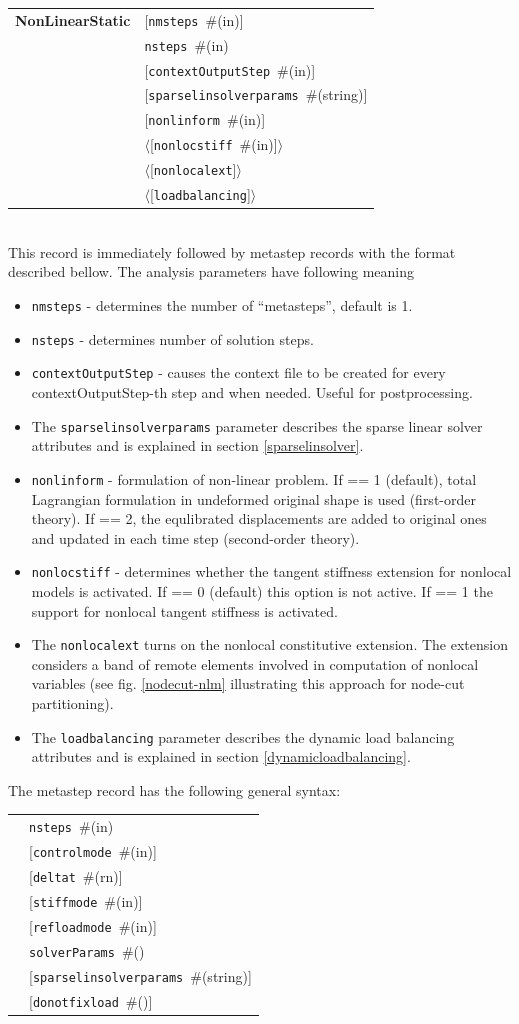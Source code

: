 \documentclass[a4paper]{article}
\makeatletter
\newcommand{\param}[1]{\texttt{#1}} %
\newcommand{\optional}[1]{[#1]} %
\newcommand{\field}[2]{\param{#1}~\#{\tiny(#2)}} %
\newcommand{\optField}[2]{\optional{\field{#1}{#2}}}
\newcommand{\optFieldnotype}[1]{[\param{#1}]}
\newcommand{\componentNum}{(\param{num}\#){\tiny(in)}} %
\newcommand{\entKeywordInst}[1]{\textbf{#1}} %
\newcommand{\Pmode}[1]{{\sffamily #1}}
\renewcommand{\parallel}[1]{$\langle${#1}$\rangle$}
\newcommand{\PoptField      }[2]{\parallel{\optField{#1}{#2}}}
\newcommand{\PoptFieldnotype}[1]{\parallel{\optFieldnotype{#1}}}
\newenvironment{record}[1][]{\begin{tabular}{|ll}}{\end{tabular}\\}
\newcommand{\recentry}[2]{{#1}&{#2}\\}
\newcounter{rcc}
\newenvironment{record}[1][\textwidth]{\setcounter{rcc}{0}\begin{tabular*}{#1}{|ll@{\extracolsep{\fill}}r}}{\end{tabular*}\\}
\newcommand{\recentry}[2]{\ifthenelse{\value{rcc}>0}{&$\backslash$ \\}{\setcounter{rcc}{1}}{#1}&{#2}}
\makeatother
\begin{document}
\noindent
\begin{record}
  \recentry{\entKeywordInst{NonLinearStatic}}{\optField{nmsteps}{in}}
  \recentry{}{\field{nsteps}{in}}
  \recentry{}{\optField{contextOutputStep}{in}}
  \recentry{}{\optField{sparselinsolverparams}{string}}
  \recentry{}{\optField{nonlinform}{in}}
  \recentry{}{\PoptField{nonlocstiff}{in}}
  \recentry{}{\PoptFieldnotype{nonlocalext}}
  \recentry{}{\PoptFieldnotype{loadbalancing}}
\end{record}
This record is immediately followed by metastep records with the format described bellow.
The analysis parameters have following meaning
\begin{itemize}
\item \param{nmsteps} - determines the number of
``metasteps'', default is 1.
\item \param{nsteps} - determines number of solution steps.
\item \param{contextOutputStep} - causes the context file to be
created for every con\-text\-Out\-put\-Step-th step and when needed. Useful for
postprocessing.
\item The  \param{sparselinsolverparams} parameter describes the sparse
linear solver attributes and is explained in section \ref{sparselinsolver}.
\item \param{nonlinform} - formulation of non-linear problem. If == 1 (default), total Lagrangian formulation in undeformed original shape is used (first-order theory). If == 2, the equlibrated displacements are added to original ones and updated in each time step (second-order theory).
\item \Pmode{\param{nonlocstiff} - determines whether the tangent stiffness
extension for nonlocal models is activated. If == 0 (default) this
option is not active. If == 1 the support for nonlocal tangent
stiffness is activated.}
\item \Pmode{The \param{nonlocalext} turns on the nonlocal constitutive
extension. The extension considers a band of remote elements involved
in computation of nonlocal variables (see fig. \ref{nodecut-nlm} illustrating
this approach for node-cut partitioning)}.
\item \Pmode{The  \param{loadbalancing} parameter describes the dynamic load balancing
attributes and is explained in section \ref{dynamicloadbalancing}}.
\end{itemize}

\noindent
The metastep record has the following general syntax:\\
\begin{record}
  \recentry{\hspace{10mm}}{\field{nsteps}{in}}
  \recentry{}{\optField{controlmode}{in}}
  \recentry{}{\optField{deltat}{rn}}
  \recentry{}{\optField{stiffmode}{in}}
  \recentry{}{\optField{refloadmode}{in}}
  \recentry{}{\field{solverParams}{}}
  \recentry{}{\optField{sparselinsolverparams}{string}}
  \recentry{}{\optField{donotfixload}{}}
\end{record}
\end{document}
